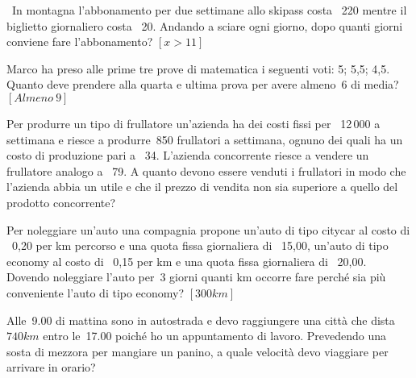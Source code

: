 \begin{multicols}{2}
 \begin{esercizio}[\Ast]
 \label{ese:21.23}
 \ In montagna l'abbonamento per due settimane allo
skipass costa \officialeuro\ 220 mentre il biglietto giornaliero costa
\officialeuro\ 20. Andando a sciare ogni giorno, dopo quanti giorni
conviene fare l'abbonamento? \hfill $\left[x>11\right]$
 \end{esercizio}

 \begin{esercizio}[\Ast]
 \label{ese:21.24}
 Marco ha preso alle prime tre prove di matematica i seguenti voti: 5;
5,5; 4,5. Quanto deve prendere alla quarta e ultima prova per avere almeno~6
di media? \hfill $\left[Almeno~9\right]$
 \end{esercizio}

 \begin{esercizio}
 \label{ese:21.25}
 Per produrre un tipo di frullatore un'azienda ha dei
costi fissi per \officialeuro\ 12\,000 a settimana e riesce a produrre~850
frullatori a settimana, ognuno dei quali ha un costo di produzione pari
a \officialeuro\ 34. L'azienda concorrente riesce a
vendere un frullatore analogo a \officialeuro\ 79. A quanto devono essere
venduti i frullatori in modo che l'azienda abbia un
utile e che il prezzo di vendita non sia superiore a quello del
prodotto concorrente?
 \end{esercizio}

 \begin{esercizio}[\Ast]
 \label{ese:21.26}
 Per noleggiare un'auto una compagnia propone
un'auto di tipo citycar al costo di \officialeuro\ 0,20 per km percorso e una 
quota fissa giornaliera
di \officialeuro\ 15,00,
un'auto di tipo economy al costo di \officialeuro\ 0,15
per km e una quota fissa giornaliera di \officialeuro\ 20,00. Dovendo
noleggiare l'auto per~3 giorni quanti km occorre fare
perché sia più conveniente l'auto di tipo economy?
 \hfill $\left[300\unit{km}\right]$
 \end{esercizio}

 \begin{esercizio}
 \label{ese:21.27}
 Alle~9.00 di mattina sono in autostrada e devo raggiungere una città
che dista~$740\unit{km}$ entro le~17.00 poiché ho un appuntamento di lavoro.
Prevedendo una sosta di mezzora per mangiare un panino, a quale
velocità devo viaggiare per arrivare in orario?
 \end{esercizio}



\end{multicols}
